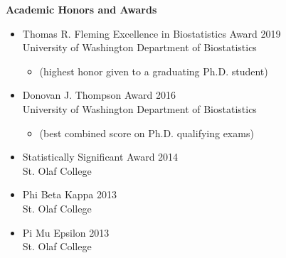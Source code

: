 \documentclass[margin]{res}
\begin{document}
\begin{resume}
\textbf{Academic Honors and Awards}
\begin{itemize} 
\item Thomas R. Fleming Excellence in Biostatistics Award \hfill 2019 \\   
University of Washington Department of Biostatistics
	\begin{itemize} \vspace{-0.2cm}
	\item[] 
	\begin{small}(highest honor given to a graduating Ph.D. student)\end{small}
	\end{itemize} \vspace{-0.1cm}
\item Donovan J. Thompson Award \hfill 2016 \\
University of Washington Department of Biostatistics 
	\begin{itemize} \vspace{-0.2cm}
	\item[] 
	\begin{small}(best combined score on Ph.D. qualifying exams) \end{small}
	\end{itemize} \vspace{-0.1cm}
\item Statistically Significant Award \hfill 2014 \\
St. Olaf College  
\item Phi Beta Kappa \hfill 2013 \\St. Olaf College 
\item Pi Mu Epsilon \hfill 2013 \\ St. Olaf College  \\
\end{itemize}


\end{resume}
\end{document}
